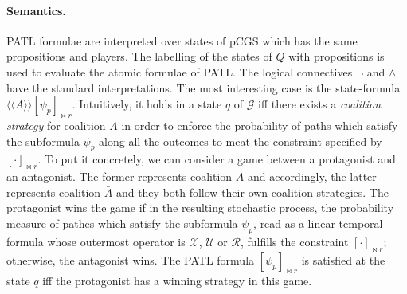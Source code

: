 \documentclass[times, 10 pt,twocolumn]{article}
\newcommand{\mc}[1]{\mathcal{#1}}
\newcommand{\lla}{\langle\langle}
\newcommand{\rra}{\rangle\rangle}
\begin{document}
\paragraph{Semantics.} PATL formulae are interpreted over states of
pCGS which has the same propositions and players. The labelling of
the states of $Q$ with propositions is used to evaluate the atomic
formulae of PATL. The logical connectives $\neg$ and $\wedge$ have
the standard interpretations. The most interesting case is the
state-formula $\lla A\rra [\psi_p]_{\bowtie r}$. Intuitively, it
holds in a state $q$ of $\mc{G}$ iff there exists a
\emph{coalition strategy} for coalition $A$ in order to enforce
the probability of paths which satisfy the subformula $\psi_p$
along all the outcomes to meat the constraint specified by
$[\cdot]_{\bowtie r}$. To put it concretely, we can consider a
game between a protagonist and an antagonist. The former
represents coalition $A$ and accordingly, the latter represents
coalition $\bar{A}$ and they both follow their own coalition
strategies. The protagonist wins the game if in the resulting
stochastic process, the probability measure of pathes which
satisfy the subformula $\psi_p$, read as a linear temporal formula
whose outermost operator is $\mc{X}$, $\mc{U}$ or $\mc{R}$,
fulfills the constraint $[\cdot]_{\bowtie r}$; otherwise, the
antagonist wins. The PATL formula $[\psi_p]_{\bowtie r}$ is
satisfied at the state $q$ iff the protagonist has a winning
strategy in this game.
\end{document}
